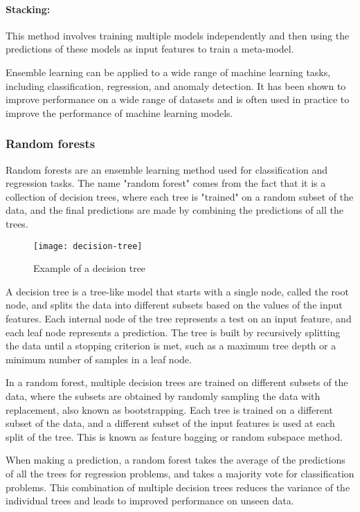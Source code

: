 \paragraph{Stacking:} This method involves training multiple models independently and then using the predictions of these models as input features to train a meta-model.

Ensemble learning can be applied to a wide range of machine learning tasks, including classification, regression, and anomaly detection. It has been shown to improve performance on a wide range of datasets and is often used in practice to improve the performance of machine learning models.


\subsubsection{Random forests}

Random forests are an ensemble learning method used for classification and regression tasks. The name "random forest" comes from the fact that it is a collection of decision trees, where each tree is "trained" on a random subset of the data, and the final predictions are made by combining the predictions of all the trees.

\begin{figure}[h]
  \centering
  \texttt{[image: decision-tree]}
  \caption{Example of a decision tree}
\end{figure}

A decision tree is a tree-like model that starts with a single node, called the root node, and splits the data into different subsets based on the values of the input features. Each internal node of the tree represents a test on an input feature, and each leaf node represents a prediction. The tree is built by recursively splitting the data until a stopping criterion is met, such as a maximum tree depth or a minimum number of samples in a leaf node.

In a random forest, multiple decision trees are trained on different subsets of the data, where the subsets are obtained by randomly sampling the data with replacement, also known as bootstrapping. Each tree is trained on a different subset of the data, and a different subset of the input features is used at each split of the tree. This is known as feature bagging or random subspace method.

When making a prediction, a random forest takes the average of the predictions of all the trees for regression problems, and takes a majority vote for classification problems. This combination of multiple decision trees reduces the variance of the individual trees and leads to improved performance on unseen data.

